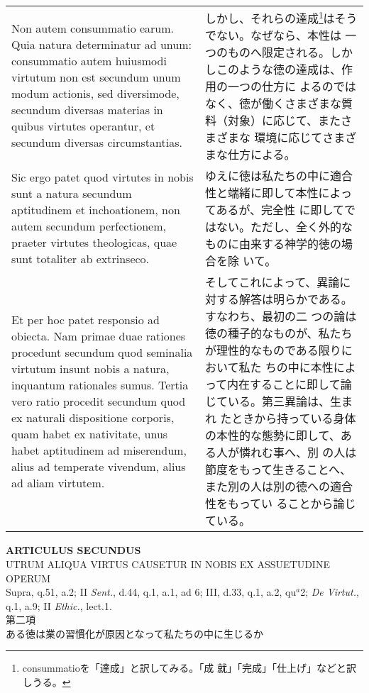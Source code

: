 \documentclass[10pt]{jsarticle}
\begin{document}
\begin{longtable}{p{21em}p{21em}}
 
\\


 Non autem consummatio earum. Quia natura determinatur ad unum:
 consummatio autem huiusmodi virtutum non est secundum unum modum
 actionis, sed diversimode, secundum diversas materias in quibus
 virtutes operantur, et secundum diversas circumstantias.

&

しかし、それらの達成\footnote{consummatioを「達成」と訳してみる。「成
就」「完成」「仕上げ」などと訳しうる。}はそうでない。なぜなら、本性は
一つのものへ限定される。しかしこのような徳の達成は、作用の一つの仕方に
よるのではなく、徳が働くさまざまな質料（対象）に応じて、またさまざまな
環境に応じてさまざまな仕方による。
 
\\


 Sic ergo patet quod virtutes in nobis sunt a natura secundum
 aptitudinem et inchoationem, non autem secundum perfectionem, praeter
 virtutes theologicas, quae sunt totaliter ab extrinseco.

&

 ゆえに徳は私たちの中に適合性と端緒に即して本性によってあるが、完全性
 に即してではない。ただし、全く外的なものに由来する神学的徳の場合を除
 いて。

 
\\


Et per hoc patet responsio ad obiecta. Nam primae duae rationes
procedunt secundum quod seminalia virtutum insunt nobis a natura,
inquantum rationales sumus. Tertia vero ratio procedit secundum quod
ex naturali dispositione corporis, quam habet ex nativitate, unus
habet aptitudinem ad miserendum, alius ad temperate vivendum, alius ad
aliam virtutem.


&

そしてこれによって、異論に対する解答は明らかである。すなわち、最初の二
つの論は徳の種子的なものが、私たちが理性的なものである限りにおいて私た
ちの中に本性によって内在することに即して論じている。第三異論は、生まれ
たときから持っている身体の本性的な態勢に即して、ある人が憐れむ事へ、別
の人は節度をもって生きることへ、また別の人は別の徳への適合性をもってい
ることから論じている。
 


\end{longtable}
\newpage

\begin{center}
{\Large {\bf ARTICULUS SECUNDUS}}\\
{\large UTRUM ALIQUA VIRTUS CAUSETUR IN NOBIS EX ASSUETUDINE OPERUM}\\
{\footnotesize Supra, q.51, a.2; II {\itshape Sent.}, d.44, q.1, a.1, ad 6; III, d.33, q.1, a.2, qu$^{a}$2; {\itshape De Virtut.}, q.1, a.9; II {\itshape Ethic.}, lect.1.}\\
{\Large 第二項\\ある徳は業の習慣化が原因となって私たちの中に生じるか}
\end{center}
\end{document}
